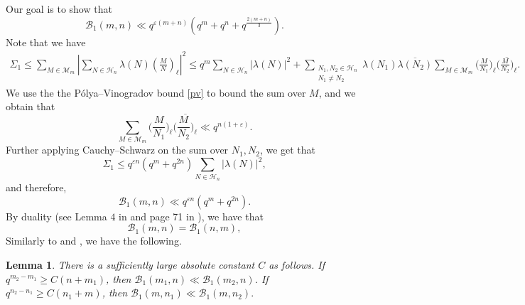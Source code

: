 \documentclass[12pt]{amsart}
\newtheorem{lemma}[theorem]{Lemma}
\def\cH{\mathcal{H}}
\def\cH{\mathcal{H}}
\newcommand{\legl}[2]{\left( \frac{#1}{#2} \right)_\ell}
\begin{document}
Our goal is to show that
$$\mathcal{B}_1(m,n) \ll q^{\varepsilon(m+n)} (q^m+q^n+q^{\frac{2(m+n)}{3}}).$$
Note that we have
\begin{align*}
\Sigma_1 \leq \sum_{M \in \mathcal{M}_m}  \left| \sum_{N \in \cH_n} \lambda(N) \legl{M}{N} \right|^2 \leq q^m  \sum_{N \in \mathcal{H}_n} |\lambda(N)|^2 + \sum_{\substack{N_1, N_2 \in \mathcal{H}_n \\ N_1 \neq N_2}} \lambda(N_1) \overline{\lambda(N_2)} \sum_{M \in \mathcal{M}_m} \Big(  \frac{M}{N_1} \Big)_{\ell} \overline{ \Big(  \frac{M}{N_2} \Big)_{\ell}}.
\end{align*}
We use the the P\'olya--Vinogradov bound \eqref{pv} to bound the sum over $M$, and we obtain that
$$\sum_{M \in \mathcal{M}_m} \Big(  \frac{M}{N_1} \Big)_{\ell} \overline{ \Big(  \frac{M}{N_2} \Big)_{\ell}} \ll q^{n(1+\varepsilon)}.$$
Further applying Cauchy--Schwarz on the sum over $N_1, N_2$, we get that
$$\Sigma_1 \leq q^{\varepsilon n} (q^m+q^{2n}) \sum_{N \in \mathcal{H}_n} |\lambda(N)|^2,$$
and therefore,
\begin{equation}
\label{initial_bound}
\mathcal{B}_1(m,n) \ll q^{\varepsilon n} (q^m+q^{2n}).
\end{equation}
By duality (see Lemma $4$ in \cite{FloreaSound} and page 71 in \cite{Montgomery}),
we have that
\begin{equation*}
\mathcal{B}_1(m,n) = \mathcal{B}_1(n,m),
\end{equation*}
Similarly to \cite[Lemma $5$]{FloreaSound} and \cite[Lemma $9$]{HB95}, we have the following.
\begin{lemma}
\label{increasing}
There is a sufficiently large absolute constant $C$ as follows.  If $q^{m_2-m_1} \geq C(n+m_1)$, then $\mathcal{B}_1(m_1,n) \ll \mathcal{B}_1(m_2,n)$. If $q^{n_2-n_1} \geq C(n_1+m)$, then $\mathcal{B}_1(m,n_1) \ll \mathcal{B}_1(m,n_2).$
\end{lemma}
\end{document}
